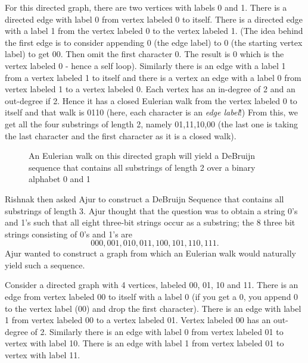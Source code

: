 For this directed graph, there are two vertices with labels 0 and 1. There is a directed edge with label 0 from vertex labeled 0 to itself. There is a directed edge with a label 1 from the vertex labeled 0 to the vertex labeled 1. (The idea behind the first edge is to consider appending 0 (the edge label) to 0 (the starting vertex label) to get 00. Then omit the first character 0. The result is 0 which is the vertex labeled 0 - hence a self loop).  Similarly there is an edge with a label 1 from a vertex labeled 1 to itself and there is a vertex an edge with 
a label 0 from vertex labeled 1 to a vertex labeled 0.
Each vertex has an in-degree of 2 and an out-degree if 2. Hence it has a closed Eulerian walk from the vertex labeled 0 to itself and that walk is 0110 (here, each character is an \emph{edge label}!) From this, we get all the four substrings of length 2, namely 01,11,10,00 (the last one is taking the last character and the first character as it is a closed walk).

\begin{figure}
\begin{center}
\caption{ An Eulerian walk on this directed graph will yield a DeBruijn sequence that contains  all substrings of length 2 over a binary alphabet 0 and 1}\label{4g55}
\end{center}
\end{figure}
Rishnak then asked Ajur to construct a DeBruijn Sequence that contains all substrings of length 3.
Ajur thought that the question was to obtain a string 0's and 1's such that all eight three-bit strings occur as a substring; the 8 three bit strings consisting of 0's and 1's are 
$$000, 001, 010, 011, 100, 101, 110, 111.$$ Ajur wanted to construct a graph from which an Eulerian walk would naturally yield such a sequence. 

Consider a directed graph with 4 vertices, labeled 00, 01, 10 and 11.
There is an edge from vertex labeled 00 to itself with a label 0 (if you get a 0, you append 0 to the vertex label (00) and drop the first character). There is an edge with label 1 from
vertex labeled 00 to a vertex labeled 01. Vertex labeled 00 has an out-degree of 2. Similarly there is an edge with label 0 from vertex labeled 01 to vertex with label 10. There is an edge with label 1 from vertex labeled 01 to vertex with label 11. 


